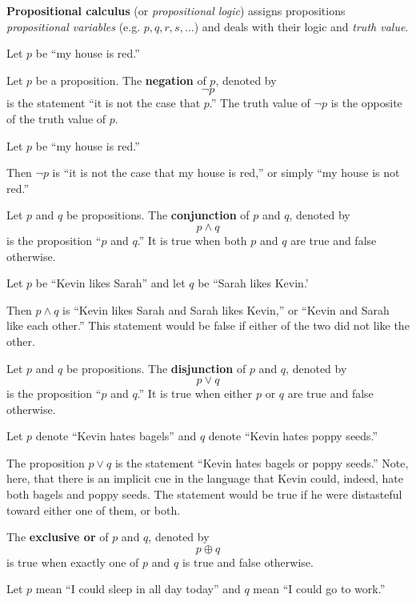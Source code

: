 \begin{defn}
  \textbf{Propositional calculus} (or \emph{propositional logic}) assigns propositions \emph{propositional variables}
  (e.g. \(p, q, r, s, \ldots\)) and deals with their logic and \emph{truth value}.
  \begin{ex}
    Let $p$ be ``my house is red.''
  \end{ex}

  Let \(p\) be a proposition. The \textbf{negation} of \(p\), denoted by \[\neg p\] is the statement
  ``it is not the case that \(p\).''
  The truth value of \(\neg p\) is the opposite of the truth value of \(p\).
  \begin{ex}
    Let $p$ be ``my house is red.''

    Then $\neg p$ is ``it is not the case that my house is red,'' or simply ``my house is not red.''
  \end{ex}

  Let \(p\) and \(q\) be propositions. The \textbf{conjunction} of \(p\) and \(q\), denoted by \[ p \wedge q \] is the proposition
  ``\(p\) and \(q\).'' It is true when both \(p\) and \(q\) are true and false otherwise.
  \begin{ex}
    Let $p$ be ``Kevin likes Sarah'' and let $q$ be ``Sarah likes Kevin.'

    Then $p \wedge q$ is ``Kevin likes Sarah and Sarah likes Kevin,'' or ``Kevin and Sarah like each other.''
    This statement would be false if either of the two did not like the other.
  \end{ex}

  Let \(p\) and \(q\) be propositions. The \textbf{disjunction} of \(p\) and \(q\), denoted by \[ p \vee q \] is the proposition
  ``\(p\) and \(q\).'' It is true when either \(p\) or \(q\) are true and false otherwise.
  \begin{ex}
    Let $p$ denote ``Kevin hates bagels'' and $q$ denote ``Kevin hates poppy seeds.''

    The proposition $p \vee q$ is the statement ``Kevin hates bagels or poppy seeds.''
    Note, here, that there is an implicit cue in the language that Kevin could, indeed, hate both bagels and poppy seeds.
    The statement would be true if he were distasteful toward either one of them, or both.
  \end{ex}

  The \textbf{exclusive or} of \(p\) and \(q\), denoted by \[p \oplus q\] is true when exactly one of \(p\) and \(q\) is true and false otherwise.
  \begin{ex}
    Let $p$ mean ``I could sleep in all day today'' and $q$ mean ``I could go to work.''


\end{ex}
\end{defn}

